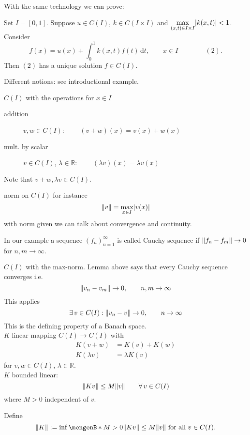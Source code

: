 With the same technology we can prove:
\begin{theorem}
	Set $I = [0,1]$. Suppose $u \in C(I)$, $k \in C(I \times I)$ and $\max\limits_{(x,t) \in I \times I} \lvert k(x,t)\rvert <1$. Consider \[
		f(x) = u(x) + \int_{0}^{1}k(x,t)f(t) \,\mathrm{d}t, \qquad x \in I \qquad \qquad (2).
	\]
	Then $(2)$ has a unique solution $f \in C(I)$.
\end{theorem}
Different notions: see introductional example.
\begin{definition*}
	$C(I)$ with the operations for $x \in I$
	\begin{description}
		\item[addition] $v,w \in C(I)$: $\qquad (v+w)(x) = v(x)+ w(x)$ 
		\item[mult. by scalar] $v \in C(I)$, $ \lambda \in \mathbb{R}$: $\qquad (\lambda v)(x) = \lambda v(x)$ 
	\end{description}
	Note that $v+w, \lambda v \in C(I)$.
\end{definition*}
\begin{definition*}[norm]
	norm on $C(I)$ for instance 
	\[
		\norm{v} = \max_{x \in I} \abs{v(x)}
	\]
	with norm given we can talk about convergence and continuity.
\end{definition*}
\begin{definition*}
	In our example a sequence $(f_n)_{n=1}^{\infty}$ is called Cauchy sequence if $\norm{f_n-f_m} \to 0$ for $n,m \to \infty$.
\end{definition*}
\begin{definition*}
	$C(I)$ with the max-norm. Lemma above says that every Cauchy sequence converges i.e.
	\[
		\norm{v_n-v_m} \to 0, \qquad n,m \to \infty
	\]
	This applies
	\[
		\exists\, v \in C(I): \norm{v_n-v} \to 0, \qquad n \to \infty
	\]
	This is the defining property of a Banach space. \\
	$K$ linear mapping $C(I) \to C(I)$ with
	\begin{align*}
		K(v+w) &= K(v) + K(w) \\
		K(\lambda v) &= \lambda K(v)
	\end{align*}
	for $v,w \in  C(I)$, $\lambda \in \mathbb{R}$. \\
	$K$ bounded linear:
	\[
		\norm{Kv} \leq M \norm{v} \qquad \forall\, v \in C(I)
	\]
	where $M >0$ independent of $v$.	
\end{definition*}
\begin{definition*}
	Define
	\[
		\norm{K}:= \inf \set[M>0]{\norm{Kv} \leq M \norm{v} \text{ for all }v \in C(I)}.
	\]
\end{definition*}
